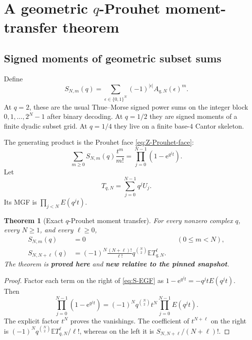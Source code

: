 \documentclass[11pt,oneside]{article}
\numberwithin{equation}{section}
\newtheorem{theorem}{Theorem}[section]
\theoremstyle{definition}
\theoremstyle{remark}
\newcommand{\E}{\mathbb E}
\newcommand{\e}{\mathrm e}
\newcommand{\proved}{\textcolor{deepgreen}{\textbf{proved here}}}
\newcommand{\auditnew}{\textcolor{deepviolet}{\textbf{new relative to the pinned snapshot}}}
\begin{document}
\section[A geometric q-Prouhet moment-transfer theorem]{A geometric $q$-Prouhet moment-transfer theorem}
\label{sec:q-prouhet}

\subsection{Signed moments of geometric subset sums}

Define
\begin{equation}
 S_{N,m}(q)=
 \sum_{\epsilon\in\{0,1\}^N}
 (-1)^{|\epsilon|}A_{q,N}(\epsilon)^m.
 \label{eq:S-Nm}
\end{equation}
At $q=2$, these are the usual Thue--Morse signed power sums on the integer
block $0,1,\ldots,2^N-1$ after binary decoding.  At $q=1/2$ they are signed
moments of a finite dyadic subset grid.  At $q=1/4$ they live on a finite
base-$4$ Cantor skeleton.

The generating product is the Prouhet face \eqref{eq:Z-Prouhet-face}:
\begin{equation}
 \sum_{m\ge0}S_{N,m}(q)\frac{t^m}{m!}
 =\prod_{j=0}^{N-1}(1-\e^{q^jt}).
 \label{eq:S-EGF}
\end{equation}
Let
\begin{equation}
 T_{q,N}=\sum_{j=0}^{N-1}q^jU_j.
 \label{eq:T-qN}
\end{equation}
Its MGF is $\prod_{j<N}E(q^jt)$.

\begin{theorem}[Exact $q$-Prouhet moment transfer]
\label{thm:q-Prouhet}
For every nonzero complex $q$, every $N\ge1$, and every $\ell\ge0$,
\begin{align}
 S_{N,m}(q)&=0 &&(0\le m<N),
 \label{eq:q-Prouhet-vanish}\\
 S_{N,N+\ell}(q)
 &=\boxed{(-1)^N\frac{(N+\ell)!}{\ell!}
 q^{\binom N2}\E T_{q,N}^{\ell}.}
 \label{eq:q-Prouhet-transfer}
\end{align}
The theorem is \proved{} and \auditnew.
\end{theorem}

\begin{proof}
Factor each term on the right of \eqref{eq:S-EGF} as
$1-\e^{q^jt}=-q^jtE(q^jt)$.  Then
\begin{equation}
 \prod_{j=0}^{N-1}(1-\e^{q^jt})
 =(-1)^Nq^{\binom N2}t^N
  \prod_{j=0}^{N-1}E(q^jt).
 \label{eq:q-Prouhet-factor}
\end{equation}
The explicit factor $t^N$ proves the vanishings.  The coefficient of
$t^{N+\ell}$ on the right is
$(-1)^Nq^{\binom N2}\E T_{q,N}^{\ell}/\ell!$, whereas on the left it is
$S_{N,N+\ell}/(N+\ell)!$.
\end{proof}
\end{document}
